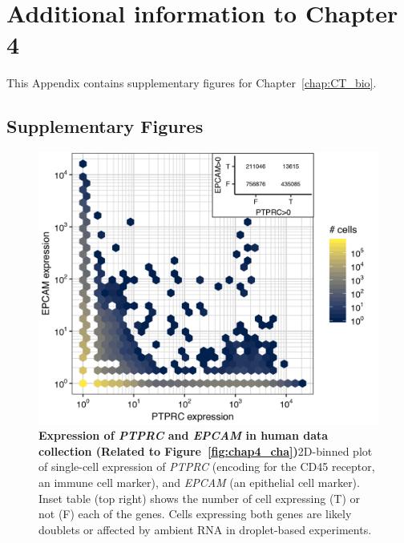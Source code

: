 
\chapter{Additional information to Chapter 4} \label{appendix:CTsub}
This Appendix contains supplementary figures for Chapter~\ref{chap:CT_bio}.


\section{Supplementary Figures}
\label{sectionB1.1}

\begin{figure}[ht!] 
\centering    
\includegraphics[scale=0.81]{Appendix2/Figs/PTPRC_EPCAM_human.png} %
\caption[Expression of \textit{PTPRC} and \textit{EPCAM} in human data collection]{\textbf{Expression of \textit{PTPRC} and \textit{EPCAM} in human data collection (Related to Figure~\ref{fig:chap4_cha})}\newline2D-binned plot of single-cell expression of \textit{PTPRC} (encoding for the CD45 receptor, an immune cell marker), and \textit{EPCAM} (an epithelial cell marker). Inset table (top right) shows the number of cell expressing (T) or not (F) each of the genes. Cells expressing both genes are likely doublets or affected by ambient RNA in droplet-based experiments.}
\label{fig:appB_ptprc}
\end{figure}


